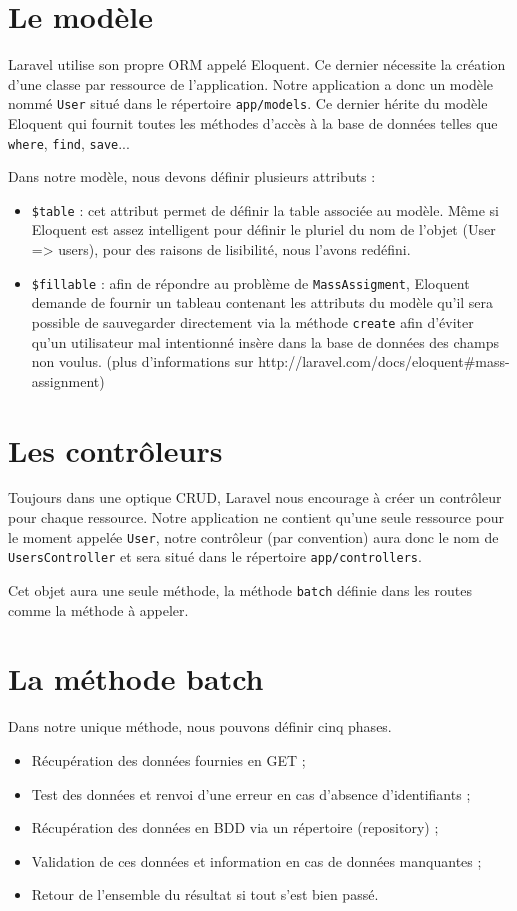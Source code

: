 \section{Le modèle}

Laravel utilise son propre ORM appelé Eloquent. Ce dernier nécessite la création d'une classe par ressource de l'application. Notre application a donc un modèle nommé \verb|User| situé dans le répertoire \verb|app/models|. Ce dernier hérite du modèle Eloquent qui fournit toutes les méthodes d'accès à la base de données telles que \verb|where|, \verb|find|, \verb|save|...

Dans notre modèle, nous devons définir plusieurs attributs :
\begin{itemize}
   \item \verb|$table| : cet attribut permet de définir la table associée au modèle. Même si Eloquent est assez intelligent pour définir le pluriel du nom de l'objet (User => users), pour des raisons de lisibilité, nous l'avons redéfini.
   \item \verb|$fillable| : afin de répondre au problème de \verb|MassAssigment|, Eloquent demande de fournir un tableau contenant les attributs du modèle qu'il sera possible de sauvegarder directement via la méthode \verb|create| afin d'éviter qu'un utilisateur mal intentionné insère dans la base de données des champs non voulus. (plus d'informations sur http://laravel.com/docs/eloquent\#mass-assignment)
\end{itemize}
\section{Les contrôleurs}

Toujours dans une optique CRUD, Laravel nous encourage à créer un contrôleur pour chaque ressource. Notre application ne contient qu'une seule ressource pour le moment appelée \verb|User|, notre contrôleur (par convention) aura donc le nom de \verb|UsersController| et sera situé dans le répertoire \verb|app/controllers|.

Cet objet aura une seule méthode, la méthode \verb|batch| définie dans les routes comme la méthode à appeler.

\section{La méthode batch}

Dans notre unique méthode, nous pouvons définir cinq phases.
\begin{itemize}
  \item Récupération des données fournies en GET ;
  \item Test des données et renvoi d'une erreur en cas d'absence d'identifiants ;
  \item Récupération des données en BDD via un répertoire (repository) ;
  \item Validation de ces données et information en cas de données manquantes ;
  \item Retour de l'ensemble du résultat si tout s'est bien passé.
\end{itemize}

